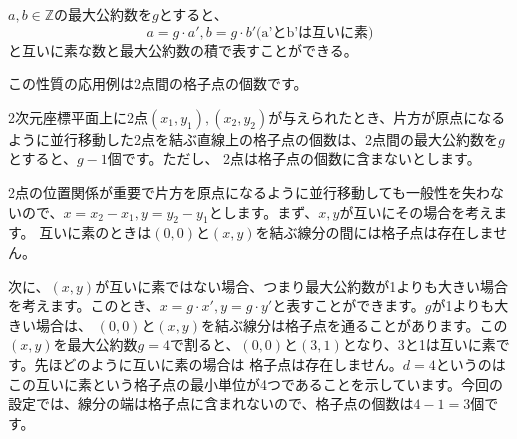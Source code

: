 \begin{theorembox}
    $a, b \in \mathbb{Z}$の最大公約数を$g$とすると、
    \begin{equation*}
        a = g \cdot a', b = g \cdot b' \text{(a'とb'は互いに素)}
    \end{equation*}
    と互いに素な数と最大公約数の積で表すことができる。
\end{theorembox}

この性質の応用例は2点間の格子点の個数です。

2次元座標平面上に2点$(x_1, y_1), (x_2, y_2)$が与えられたとき、片方が原点になるように並行移動した2点を結ぶ直線上の格子点の個数は、2点間の最大公約数を$g$とすると、$g - 1$個です。ただし、
2点は格子点の個数に含まないとします。

2点の位置関係が重要で片方を原点になるように並行移動しても一般性を失わないので、$x = x_2 - x_1, y = y_2 - y_1$とします。まず、$x, y$が互いにその場合を考えます。
互いに素のときは$(0, 0)$と$(x, y)$を結ぶ線分の間には格子点は存在しません。

\vspace{0.5cm}

\begin{center}
\end{center}

\vspace{0.5cm}

次に、$(x, y)$が互いに素ではない場合、つまり最大公約数が1よりも大きい場合を考えます。このとき、$x = g \cdot x', y = g \cdot y'$と表すことができます。$g$が1よりも大きい場合は、
$(0, 0)$と$(x, y)$を結ぶ線分は格子点を通ることがあります。この$(x, y)$を最大公約数$g = 4$で割ると、$(0, 0)$と$(3, 1)$となり、3と1は互いに素です。先ほどのように互いに素の場合は
格子点は存在しません。$d = 4$というのはこの互いに素という格子点の最小単位が4つであることを示しています。今回の設定では、線分の端は格子点に含まれないので、格子点の個数は$4 - 1 = 3$個です。


